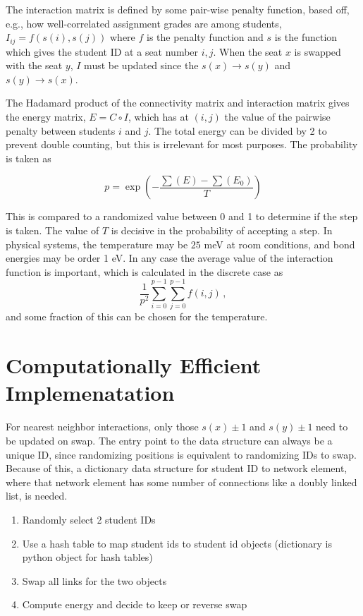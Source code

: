 \documentclass{article}
\begin{document}
The interaction matrix is defined by some pair-wise penalty function, based off, e.g., how well-correlated assignment grades are among students, $I_{ij} = f(s(i), s(j))$ where $f$ is the penalty function and $s$ is the function which gives the student ID at a seat number $i, j$. When the seat $x$ is swapped with the seat $y$, $I$ must be updated since the $s(x) \to s(y)$ and $s(y) \to s(x)$. 

The Hadamard product of the connectivity matrix and interaction matrix gives the energy matrix, $E = C \circ I$, which has at $(i,j)$ the value of the pairwise penalty between students $i$ and $j$. The total energy can be divided by 2 to prevent double counting, but this is irrelevant for most purposes. The probability is taken as

$$p = \exp\left(-\frac{\sum(E) - \sum(E_0)}{T} \right) $$

This is compared to a randomized value between 0 and 1 to determine if the step is taken. The value of $T$ is decisive in the probability of accepting a step. In physical systems, the temperature may be $25$ meV at room conditions, and bond energies may be order 1 eV. In any case the average value of the interaction function is important, which is calculated in the discrete case as $$\frac{1}{p^2} \sum_{i=0}^{p-1} \sum_{j=0}^{p-1} f(i,j) \,,$$ and some fraction of this can be chosen for the temperature. 

\section{Computationally Efficient Implemenatation}

For nearest neighbor interactions, only those $s(x) \pm 1$ and $s(y)\pm 1$ need to be updated on swap. The entry point to the data structure can always be a unique ID, since randomizing positions is equivalent to randomizing IDs to swap. Because of this, a dictionary data structure for student ID to network element, where that network element has some number of connections like a doubly linked list, is needed.

\begin{enumerate}
    \item Randomly select 2 student IDs
    \item Use a hash table to map student ids to student id objects (dictionary is python object for hash tables) 
    \item Swap all links for the two objects
    \item Compute energy and decide to keep or reverse swap
\end{enumerate}
\end{document}
